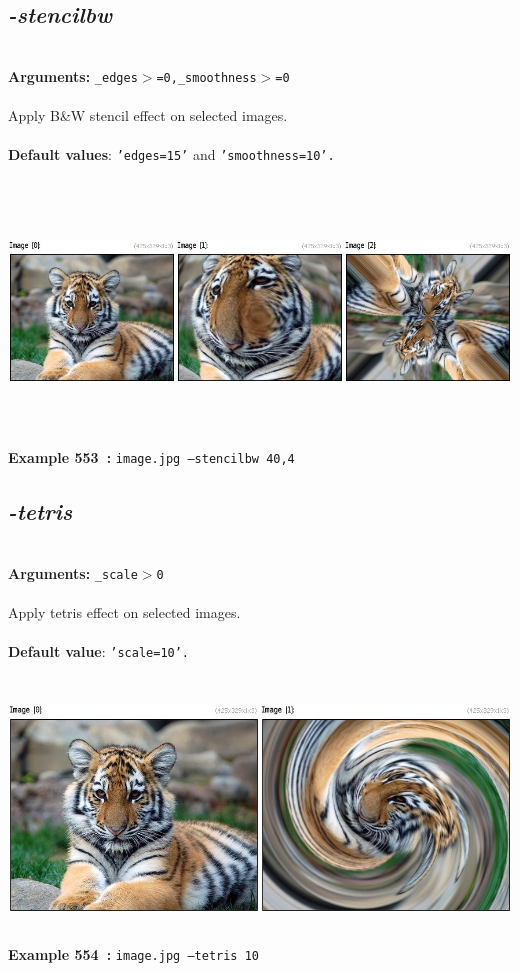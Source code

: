 \documentclass[a4paper,11pt,twoside]{book}
\begin{document}
\subsection{\emph{-stencilbw} }\vspace*{-0.5em}
~\\\textbf{Arguments: } 
{\small \texttt{\_edges$>$=0,\_smoothness$>$=0}}\\~\\
Apply B\&W stencil effect on selected images.
~\\~\\\textbf{Default values}: {\small \texttt{'edges=15'} and \texttt{'smoothness=10'.}}
\begin{center}\includegraphics[keepaspectratio=true,height=7cm,width=\textwidth]{img/gmic_def553.jpg}\\
{\footnotesize \textbf{Example 553~:} \texttt{image.jpg --stencilbw 40,4}}
\end{center}

\subsection{\emph{-tetris} }\vspace*{-0.5em}
~\\\textbf{Arguments: } 
{\small \texttt{\_scale$>$0}}\\~\\
Apply tetris effect on selected images.
~\\~\\\textbf{Default value}: {\small \texttt{'scale=10'.}}
\begin{center}\includegraphics[keepaspectratio=true,height=7cm,width=\textwidth]{img/gmic_def554.jpg}\\
{\footnotesize \textbf{Example 554~:} \texttt{image.jpg --tetris 10}}
\end{center}
\end{document}
